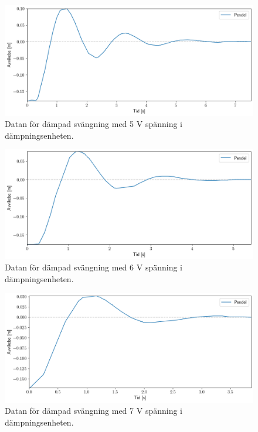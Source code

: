 \documentclass[12pt, a4paper]{article}
\begin{document}
\begin{figure}[hp]
	\includegraphics[width=\textwidth]{graf_5_v_centered}
	\caption{Datan för dämpad svängning med 5 V spänning i dämpningsenheten.}
	\label{fig:data_5_v}
\end{figure}

\begin{figure}[hp]
	\includegraphics[width=\textwidth]{graf_6_v_centered}
	\caption{Datan för dämpad svängning med 6 V spänning i dämpningsenheten.}
	\label{fig:data_6_v}
\end{figure}

\begin{figure}[hp]
	\includegraphics[width=\textwidth]{graf_7_v_centered}
	\caption{Datan för dämpad svängning med 7 V spänning i dämpningsenheten.}
	\label{fig:data_7_v}
\end{figure}
\end{document}
